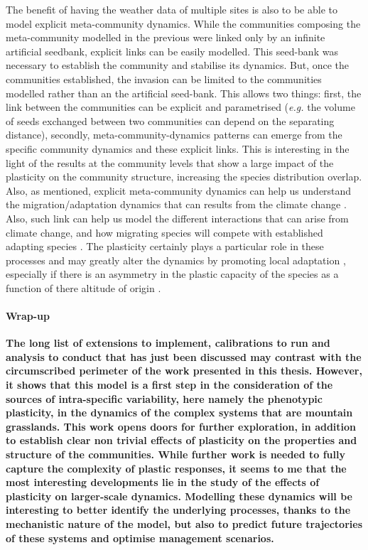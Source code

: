 The benefit of having the weather data of multiple sites is also to be able to model explicit meta-community dynamics. While the communities composing the meta-community modelled in the previous were linked only by an infinite artificial seedbank, explicit links can be easily modelled. This seed-bank was necessary to establish the community and stabilise its dynamics. But, once the communities established, the invasion can be limited to the communities modelled rather than an the artificial seed-bank. This allows two things: first, the link between the communities can be explicit and parametrised (\textit{e.g.} the volume of seeds exchanged between two communities can depend on the separating distance), secondly, meta-community-dynamics patterns can emerge from the specific community dynamics and these explicit links. This is interesting in the light of the results at the community levels that show a large impact of the plasticity on the community structure, increasing the species distribution overlap. Also, as mentioned, explicit meta-community dynamics can help us understand the migration/adaptation dynamics that can results from the climate change \parencite{morin_comparing_2009}. Also, such link can help us model the different interactions that can arise from climate change, and how migrating species will compete with established adapting species \parencite{alexander_novel_2015}. The plasticity certainly plays a particular role in these processes and may greatly alter the dynamics by promoting local adaptation \parencite{frei_plant_2014, frei_plastic_2014}, especially if there is an asymmetry in the plastic capacity of the species as a function of there altitude of origin \parencite{gugger_lower_2015, nicotra_adaptive_2015}.\\
%
%
%


\paragraph{Wrap-up}

\textbf{The long list of extensions to implement, calibrations to run and analysis to conduct that has just been discussed may contrast with the circumscribed perimeter of the work presented in this thesis. However, it shows that this model is a first step in the consideration of the sources of intra-specific variability, here namely the phenotypic plasticity, in the dynamics of the complex systems that are mountain grasslands. This work opens doors for further exploration, in addition to establish clear non trivial effects of plasticity on the properties and structure of the communities. While further work is needed to fully capture the complexity of plastic responses, it seems to me that the most interesting developments lie in the study of the effects of plasticity on larger-scale dynamics. Modelling these dynamics will be interesting to better identify the underlying processes, thanks to the mechanistic nature of the model, but also to predict future trajectories of these systems and optimise management scenarios.}

